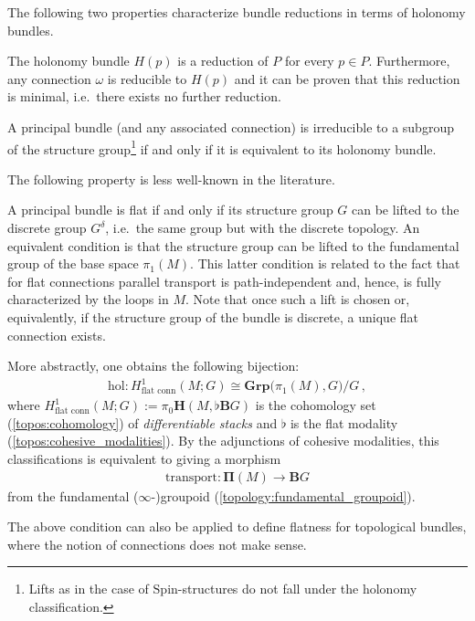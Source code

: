     The following two properties characterize bundle reductions in terms of holonomy bundles.
    \begin{property}
        The holonomy bundle $H(p)$ is a reduction of $P$ for every $p\in P$. Furthermore, any connection $\omega$ is reducible to $H(p)$ and it can be proven that this reduction is minimal, i.e.~there exists no further reduction.
    \end{property}
    \begin{result}\label{bundle:reducible_holonomy}
        A principal bundle (and any associated connection) is irreducible to a subgroup of the structure group\footnote{Lifts as in the case of $\mathrm{Spin}$-structures do not fall under the holonomy classification.} if and only if it is equivalent to its holonomy bundle.
    \end{result}

    The following property is less well-known in the literature.
    \begin{property}\label{bundle:flat_connection_cohomology}
        A principal bundle is flat if and only if its structure group $G$ can be lifted to the discrete group $G^\delta$, i.e.~the same group but with the discrete topology. An equivalent condition is that the structure group can be lifted to the fundamental group of the base space $\pi_1(M)$. This latter condition is related to the fact that for flat connections parallel transport is path-independent and, hence, is fully characterized by the loops in $M$. Note that once such a lift is chosen or, equivalently, if the structure group of the bundle is discrete, a unique flat connection exists.

        More abstractly, one obtains the following bijection:
        \begin{gather}
            \mathrm{hol}:H_{\text{flat conn}}^1(M;G)\cong\mathbf{Grp}\bigl(\pi_1(M),G\bigr)/G\,,
        \end{gather}
        where $H_{\text{flat conn}}^1(M;G):=\pi_0\mathbf{H}(M,\flat\mathbf{B}G)$ is the cohomology set (\cref{topos:cohomology}) of \textit{differentiable stacks} and $\flat$ is the flat modality (\cref{topos:cohesive_modalities}). By the adjunctions of cohesive modalities, this classifications is equivalent to giving a morphism
        \begin{gather}
            \mathrm{transport}:\symbf{\Pi}(M)\rightarrow\mathbf{B}G
        \end{gather}
        from the fundamental ($\infty$-)groupoid (\cref{topology:fundamental_groupoid}).
    \end{property}
    \begin{remark}
        The above condition can also be applied to define flatness for topological bundles, where the notion of connections does not make sense.
    \end{remark}

